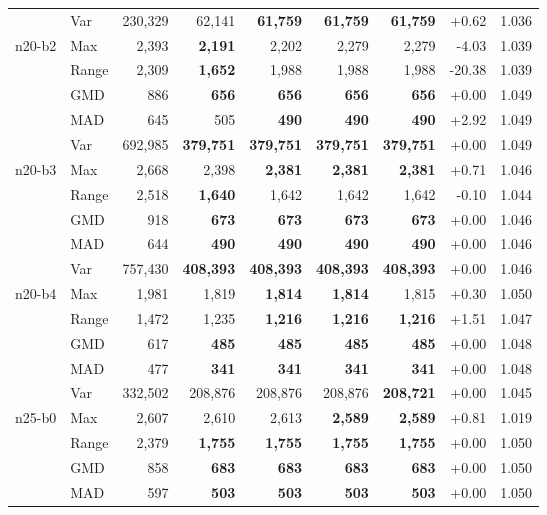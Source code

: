 \begin{small}
\begin{longtable}{llrrrrrrr}
 & Var & 230,329 & 62,141 & \textbf{61,759} & \textbf{61,759} & \textbf{61,759} & +0.62 & 1.036 \\
n20-b2 & Max & 2,393 & \textbf{2,191} & 2,202 & 2,279 & 2,279 & -4.03 & 1.039 \\
 & Range & 2,309 & \textbf{1,652} & 1,988 & 1,988 & 1,988 & -20.38 & 1.039 \\
 & GMD & 886 & \textbf{656} & \textbf{656} & \textbf{656} & \textbf{656} & +0.00 & 1.049 \\
 & MAD & 645 & 505 & \textbf{490} & \textbf{490} & \textbf{490} & +2.92 & 1.049 \\
 & Var & 692,985 & \textbf{379,751} & \textbf{379,751} & \textbf{379,751} & \textbf{379,751} & +0.00 & 1.049 \\
n20-b3 & Max & 2,668 & 2,398 & \textbf{2,381} & \textbf{2,381} & \textbf{2,381} & +0.71 & 1.046 \\
 & Range & 2,518 & \textbf{1,640} & 1,642 & 1,642 & 1,642 & -0.10 & 1.044 \\
 & GMD & 918 & \textbf{673} & \textbf{673} & \textbf{673} & \textbf{673} & +0.00 & 1.046 \\
 & MAD & 644 & \textbf{490} & \textbf{490} & \textbf{490} & \textbf{490} & +0.00 & 1.046 \\
 & Var & 757,430 & \textbf{408,393} & \textbf{408,393} & \textbf{408,393} & \textbf{408,393} & +0.00 & 1.046 \\
n20-b4 & Max & 1,981 & 1,819 & \textbf{1,814} & \textbf{1,814} & 1,815 & +0.30 & 1.050 \\
 & Range & 1,472 & 1,235 & \textbf{1,216} & \textbf{1,216} & \textbf{1,216} & +1.51 & 1.047 \\
 & GMD & 617 & \textbf{485} & \textbf{485} & \textbf{485} & \textbf{485} & +0.00 & 1.048 \\
 & MAD & 477 & \textbf{341} & \textbf{341} & \textbf{341} & \textbf{341} & +0.00 & 1.048 \\
 & Var & 332,502 & 208,876 & 208,876 & 208,876 & \textbf{208,721} & +0.00 & 1.045 \\
n25-b0 & Max & 2,607 & 2,610 & 2,613 & \textbf{2,589} & \textbf{2,589} & +0.81 & 1.019 \\
 & Range & 2,379 & \textbf{1,755} & \textbf{1,755} & \textbf{1,755} & \textbf{1,755} & +0.00 & 1.050 \\
 & GMD & 858 & \textbf{683} & \textbf{683} & \textbf{683} & \textbf{683} & +0.00 & 1.050 \\
 & MAD & 597 & \textbf{503} & \textbf{503} & \textbf{503} & \textbf{503} & +0.00 & 1.050 \\

\end{longtable}
\end{small}
